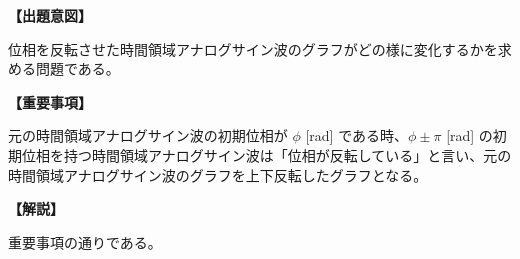 \noindent \textbf{【出題意図】}

\noindent 位相を反転させた時間領域アナログサイン波のグラフがどの様に変化するかを求める問題である。

\vspace{1em}
\noindent \textbf{【重要事項】}

\bigskip
元の時間領域アナログサイン波の初期位相が $\phi$ [rad] である時、$\phi \pm \pi$ [rad] の初期位相を持つ時間領域アナログサイン波は「位相が反転している」と言い、元の時間領域アナログサイン波のグラフを上下反転したグラフとなる。

\vspace{1em}
\noindent \textbf{【解説】}

\noindent 重要事項の通りである。
